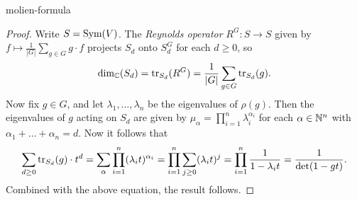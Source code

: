 \begin{example}{molien-formula}
    \begin{proof}
        Write $S = \textup{Sym}(V)$. The \textit{Reynolds operator} $R^G : S \to S$ given by $f \mapsto \frac{1}{|G|} \sum_{g \in G} g \cdot f$ projects $S_d$ onto $S^G_d$ for each $d \ge 0$, so
        \[ \dim_{\mathbb{C}}(S_d) = \operatorname{tr}_{S_d}(R^G) = \frac{1}{|G|} \sum_{g \in G} \operatorname{tr}_{S_d}(g) . \]
        Now fix $g \in G$, and let $\lambda_1, \ldots, \lambda_n$ be the eigenvalues of $\rho(g)$. Then the eigenvalues of $g$ acting on $S_d$ are given by $\mu_\alpha = \prod_{i = 1}^{n} \lambda_i^{\alpha_i}$ for each $\alpha \in \mathbb{N}^n$ with $\alpha_1 + \ldots + \alpha_n = d$. Now it follows that
        \[ \sum_{d \ge 0} \operatorname{tr}_{S_d}(g) \cdot t^d = \sum_{\alpha} \prod_{i = 1}^{n} (\lambda_i t)^{\alpha_i} = \prod_{i = 1}^{n} \sum_{j \ge 0} (\lambda_i t)^j = \prod_{i = 1}^{n} \frac{1}{1 - \lambda_i t} = \frac{1}{\det(1 - gt)} . \]
        Combined with the above equation, the result follows.
    \end{proof}
\end{example}
